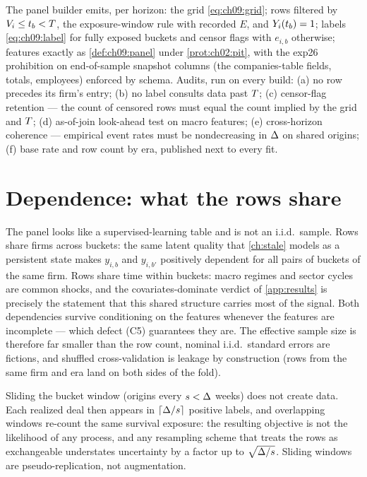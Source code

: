 \begin{protocol}\label{prot:ch09:panel}
The panel builder emits, per horizon: the grid \cref{eq:ch09:grid}; rows
filtered by $V_i \le t_b < T$, the exposure-window rule with
recorded $E$, and $Y_i(t_b)=1$; labels \cref{eq:ch09:label} for
fully exposed buckets and censor flags with $e_{i,b}$ otherwise;
features exactly as \cref{def:ch09:panel} under \cref{prot:ch02:pit},
with the exp26 prohibition on end-of-sample snapshot columns (the
companies-table  fields, totals, employees) enforced by
schema. Audits, run on every build: (a) no row precedes its firm's
entry; (b) no label consults data past $T$; (c) censor-flag
retention --- the count of censored rows must equal the count implied by
the grid and $T$; (d) as-of-join look-ahead test on macro features;
(e) cross-horizon coherence --- empirical event rates must be
nondecreasing in $\Delta$ on shared origins; (f) base rate and row
count by era, published next to every fit.
\end{protocol}

\section{Dependence: what the rows share}\label{ch09:sec:dependence}

The panel looks like a supervised-learning table and is not an i.i.d.\
sample. Rows share firms across buckets: the same latent quality that
\cref{ch:stale} models as a persistent state makes $y_{i,b}$ and
$y_{i,b'}$ positively dependent for all pairs of buckets of the same
firm. Rows share time within buckets: macro regimes and sector cycles
are common shocks, and the covariates-dominate verdict of
\cref{app:results} is precisely the statement that this shared
structure carries most of the signal. Both dependencies survive
conditioning on the features whenever the features are incomplete ---
which defect (C5) guarantees they are. The effective sample size is
therefore far smaller than the row count, nominal i.i.d.\ standard
errors are fictions, and shuffled cross-validation is leakage by
construction (rows from the same firm and era land on both sides of the
fold).

\begin{warning}\label{warn:ch09:sliding}
Sliding the bucket window (origins every $s < \Delta$ weeks) does not
create data. Each realized deal then appears in $\lceil \Delta/s
\rceil$ positive labels, and overlapping windows re-count the same
survival exposure: the resulting objective is not the likelihood of any
process, and any resampling scheme that treats the rows as exchangeable
understates uncertainty by a factor up to $\sqrt{\Delta/s}$. Sliding
windows are pseudo-replication, not augmentation.
\end{warning}

